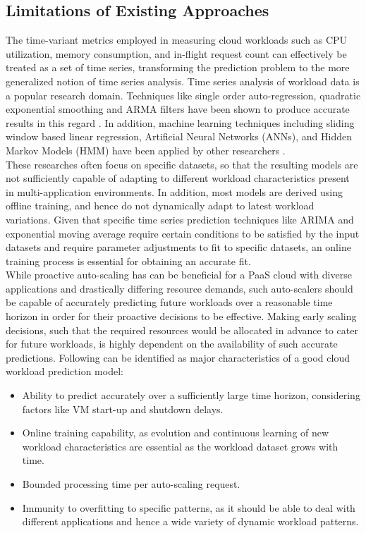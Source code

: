 \subsection{Limitations of Existing Approaches}

The time-variant metrics employed in measuring cloud workloads such as CPU utilization, memory consumption, and in-flight request count can effectively be treated as a set of time series, transforming the prediction problem to the more generalized notion of time series analysis. Time series analysis of workload data is a popular research domain. Techniques like single order auto-regression, quadratic exponential smoothing and ARMA filters have been shown to produce accurate results in this regard \cite{Kupferman_2009} \cite{Mi_2010} \cite{Roy_2011}. In addition, machine learning techniques including sliding window based linear regression, Artificial Neural Networks (ANNs), and Hidden Markov Models (HMM) have been applied by other researchers \cite{Yang_2013} \cite{Khan_2012}.\\

These researches often focus on specific datasets, so that the resulting models are not sufficiently capable of adapting to different workload characteristics present in multi-application environments. In addition, most models are derived using offline training, and hence do not dynamically adapt to latest workload variations. Given that specific time series prediction techniques like ARIMA and exponential moving average require certain conditions to be satisfied by the input datasets and require parameter adjustments to fit to specific datasets, an online training process is essential for obtaining an accurate fit.\\

While proactive auto-scaling has can be beneficial for a PaaS cloud with diverse applications and drastically differing resource demands, such auto-scalers should be capable of accurately predicting future workloads over a reasonable time horizon in order for their proactive decisions to be effective. Making early scaling decisions, such that the required resources would be allocated in advance to cater for future workloads, is highly dependent on the availability of such accurate predictions. Following can be identified as major characteristics of a good cloud workload prediction model:

\begin{itemize}
\item Ability to predict accurately over a sufficiently large time horizon, considering factors like VM start-up and shutdown delays.
\item Online training capability, as evolution and continuous learning of new workload characteristics are essential as the workload dataset grows with time.
\item Bounded processing time per auto-scaling request.
\item Immunity to overfitting to specific patterns, as it should be able to deal with different applications and hence a wide variety of dynamic workload patterns.
\end{itemize}
